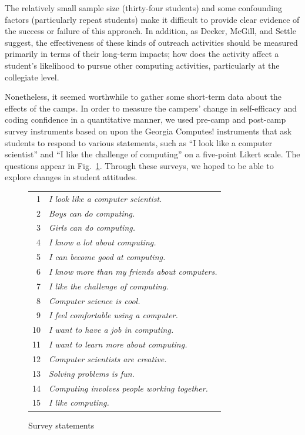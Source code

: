 The relatively small sample size (thirty-four students) and some
confounding factors (particularly repeat students) make it difficult
to provide clear evidence of the success or failure of this approach.
In addition, as Decker, McGill, and Settle \cite{Decker2016,McGill2015}
suggest, the effectiveness of these kinds of outreach activities
should be measured primarily in terms of their long-term impacts;
how does the activity affect a student's likelihood to pursue other
computing activities, particularly at the collegiate level.

Nonetheless, it seemed worthwhile to gather some short-term data
about the effects of the camps.  In order to measure the campers'
change in self-efficacy and coding confidence in a quantitative
manner, we used pre-camp and post-camp survey instruments based on
upon the Georgia Computes! instruments \cite{Bruckman2009} that ask
students to respond to various statements, such as ``I look like a
computer scientist'' and ``I like the challenge of computing'' on
a five-point Likert scale.  The questions appear in
Fig.~\ref{figure:survey}.  Through these surveys, we hoped to be
able to explore changes in student attitudes.

\begin{figure}
{\small
\begin{tabular}{rl}
1 & \textit{I look like a computer scientist.} \\
2 & \textit{Boys can do computing.} \\
3 & \textit{Girls can do computing.} \\
4 & \textit{I know a lot about computing.} \\
5 & \textit{I can become good at computing.} \\
6 & \textit{I know more than my friends about computers.} \\
7 & \textit{I like the challenge of computing.} \\
8 & \textit{Computer science is cool.} \\
9 & \textit{I feel comfortable using a computer.} \\
10 & \textit{I want to have a job in computing.} \\
11 & \textit{I want to learn more about computing.} \\
12 & \textit{Computer scientists are creative.} \\
13 & \textit{Solving problems is fun.} \\
14 & \textit{Computing involves people working together.} \\
15 & \textit{I like computing.} 
\end{tabular}
}
\label{figure:survey}
\caption{Survey statements}
\end{figure}

